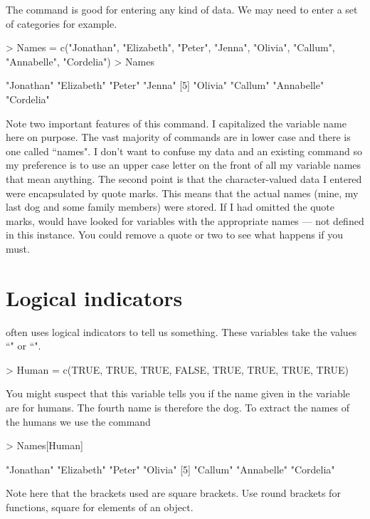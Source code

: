 The  command is good for entering any kind of data. We may need to enter a set of categories for example. 
\begin{Schunk}
\begin{Sinput}
> Names = c("Jonathan", "Elizabeth", "Peter", "Jenna", "Olivia", "Callum", "Annabelle", "Cordelia") 
> Names 
\end{Sinput}
\begin{Soutput}
[1] "Jonathan"  "Elizabeth" "Peter"     "Jenna"    
[5] "Olivia"    "Callum"    "Annabelle" "Cordelia" 
\end{Soutput}
\end{Schunk}
Note two important features of this command. I capitalized the variable name here on purpose. The vast majority of \R{} commands are in lower case and there is one called ``names". I don't want to confuse my data and an existing \R{} command so my preference is to use an upper case letter on the front of all my variable names that mean anything. The second point is that the character-valued data I entered were encapsulated by quote marks. This means that the actual names (mine, my last dog and some family members) were stored. If I had omitted the quote marks, \R{} would have looked for variables with the appropriate names --- not defined in this instance. You could remove a quote or two to see what happens if you must. 
 
\section{Logical indicators} 
 
\R{} often uses logical indicators to tell us something. These variables take the values ``" or ``". 
 
\begin{Schunk}
\begin{Sinput}
> Human = c(TRUE, TRUE, TRUE, FALSE, TRUE, TRUE, TRUE, TRUE) 
\end{Sinput}
\end{Schunk}
You might suspect that this variable tells you if the name given in the  variable are for humans. The fourth name is therefore the dog. To extract the names of the humans we use the command 
\begin{Schunk}
\begin{Sinput}
> Names[Human] 
\end{Sinput}
\begin{Soutput}
[1] "Jonathan"  "Elizabeth" "Peter"     "Olivia"   
[5] "Callum"    "Annabelle" "Cordelia" 
\end{Soutput}
\end{Schunk}
Note here that the brackets used are square brackets. Use round brackets for functions, square for elements of an object. 
 
